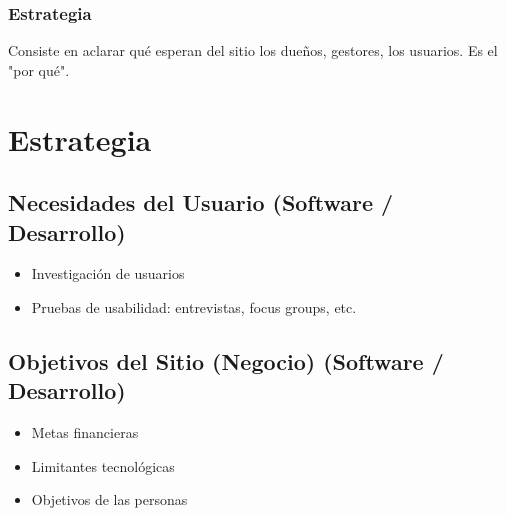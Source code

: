 \documentclass{article}
\begin{document}
\subsubsection{Estrategia}
Consiste en aclarar qué esperan del sitio los dueños, gestores, los usuarios. Es el "por qué".

\section{Estrategia}
\subsection{Necesidades del Usuario (Software / Desarrollo)}
\begin{itemize}
    \item Investigación de usuarios
    \item Pruebas de usabilidad: entrevistas, focus groups, etc.
\end{itemize}

\subsection{Objetivos del Sitio (Negocio) (Software / Desarrollo)}
\begin{itemize}
    \item Metas financieras
    \item Limitantes tecnológicas
    \item Objetivos de las personas
\end{itemize}
\end{document}

